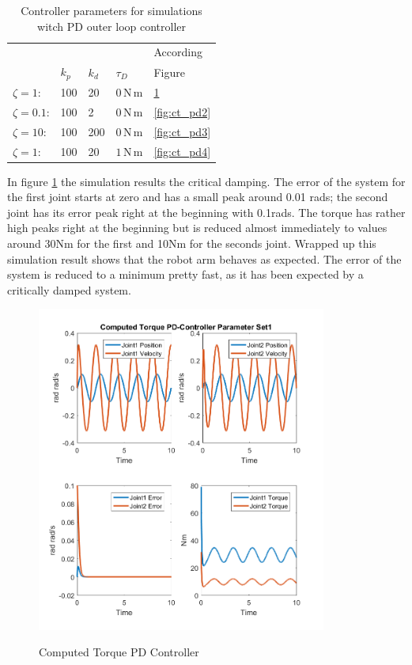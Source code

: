 \begin{table}[h]
	\begin{center}
		
		\label{tab:ch2_pdparams}
		\begin{tabular}{lllll}
			& & & & According \\
			& $k_{p}$ & $k_{d}$ & $\tau_D$ & Figure \\
			\midrule
			$\zeta = 1$: & 100 & 20 & $0\,\mathrm{N\,m}$ & \ref{fig:ct_pd1} \\
			$\zeta = 0.1$: & 100 & 2 & $0\,\mathrm{N\,m}$ & \ref{fig:ct_pd2} \\
			$\zeta = 10$: & 100 & 200 & $0\,\mathrm{N\,m}$ & \ref{fig:ct_pd3} \\
			$\zeta = 1$: & 100 & 20 & $1\,\mathrm{N\,m}$ & \ref{fig:ct_pd4} \\
			\bottomrule
		\end{tabular}
	\caption{Controller parameters for simulations witch PD outer loop controller}
	\end{center}
\end{table}

In figure \ref{fig:ct_pd1} the simulation results the critical damping. The error of the system for the first joint starts at zero and has a small peak around 0.01 rads; the second joint has its error peak right at the beginning with 0.1rads. The torque has rather high peaks right at the beginning but is reduced almost immediately to values around 30Nm for the first and 10Nm for the seconds joint. Wrapped up this simulation result shows that the robot arm behaves as expected. The error of the system is reduced to a minimum pretty fast, as it has been expected by a critically damped system.\\

\begin{figure}[]
	\centering
	\includegraphics[width=0.85\textwidth]{pics/ComputedTorquePD-ControllerParameterSet1.png}\\
	\caption{Computed Torque PD Controller}
	\label{fig:ct_pd1}
\end{figure}

